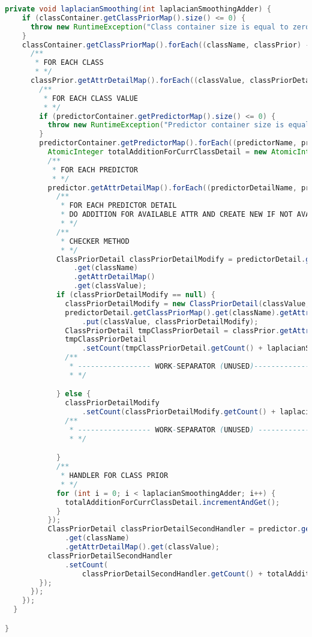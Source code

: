 \begin{lstlisting}[language=Java,basicstyle=\tiny,caption=TestingMapper.java]
  private void laplacianSmoothing(int laplacianSmoothingAdder) {
    if (classContainer.getClassPriorMap().size() <= 0) {
      throw new RuntimeException("Class container size is equal to zero.");
    }
    classContainer.getClassPriorMap().forEach((className, classPrior) -> {
      /**
       * FOR EACH CLASS
       * */
      classPrior.getAttrDetailMap().forEach((classValue, classPriorDetail) -> {
        /**
         * FOR EACH CLASS VALUE
         * */
        if (predictorContainer.getPredictorMap().size() <= 0) {
          throw new RuntimeException("Predictor container size is equal to zero.");
        }
        predictorContainer.getPredictorMap().forEach((predictorName, predictor) -> {
          AtomicInteger totalAdditionForCurrClassDetail = new AtomicInteger(0);
          /**
           * FOR EACH PREDICTOR
           * */
          predictor.getAttrDetailMap().forEach((predictorDetailName, predictorDetail) -> {
            /**
             * FOR EACH PREDICTOR DETAIL
             * DO ADDITION FOR AVAILABLE ATTR AND CREATE NEW IF NOT AVAILABLE
             * */
            /**
             * CHECKER METHOD
             * */
            ClassPriorDetail classPriorDetailModify = predictorDetail.getClassPriorMap()
                .get(className)
                .getAttrDetailMap()
                .get(classValue);
            if (classPriorDetailModify == null) {
              classPriorDetailModify = new ClassPriorDetail(classValue, laplacianSmoothingAdder);
              predictorDetail.getClassPriorMap().get(className).getAttrDetailMap()
                  .put(classValue, classPriorDetailModify);
              ClassPriorDetail tmpClassPriorDetail = classPrior.getAttrDetailMap().get(classValue);
              tmpClassPriorDetail
                  .setCount(tmpClassPriorDetail.getCount() + laplacianSmoothingAdder);
              /**
               * ----------------- WORK-SEPARATOR (UNUSED)-----------------
               * */

            } else {
              classPriorDetailModify
                  .setCount(classPriorDetailModify.getCount() + laplacianSmoothingAdder);
              /**
               * ----------------- WORK-SEPARATOR (UNUSED) -----------------
               * */

            }
            /**
             * HANDLER FOR CLASS PRIOR
             * */
            for (int i = 0; i < laplacianSmoothingAdder; i++) {
              totalAdditionForCurrClassDetail.incrementAndGet();
            }
          });
          ClassPriorDetail classPriorDetailSecondHandler = predictor.getClassPriorMap()
              .get(className)
              .getAttrDetailMap().get(classValue);
          classPriorDetailSecondHandler
              .setCount(
                  classPriorDetailSecondHandler.getCount() + totalAdditionForCurrClassDetail.get());
        });
      });
    });
  }

}
\end{lstlisting}


